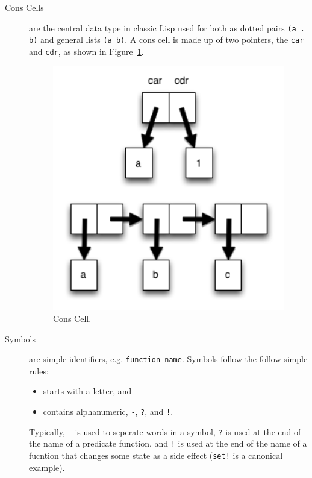 \documentclass[12pt]{article}
\begin{document}
\begin{description}

\item[Cons Cells] are the central data type in classic Lisp used for
  both as dotted pairs \verb|(a .  b)| and general lists \verb|(a b)|.
  A cons cell is made up of two pointers, the \verb|car| and
  \verb|cdr|, as shown in Figure~\ref{fig:conscell}.

\begin{figure}[htbp] %
   \centering
   \includegraphics[width=5in]{conscell.png} 
\caption{Cons Cell.}
\label{fig:conscell}
\end{figure}

\item[Symbols] are simple identifiers, e.g. \verb|function-name|.
Symbols follow the follow simple rules: 

\begin{itemize}
\item starts with a letter, and
\item contains alphanumeric, \verb|-|, \verb|?|, and \verb|!|.
\end{itemize}

Typically, \verb|-| is used to seperate words in a symbol, \verb|?| is
used at the end of the name of a predicate function, and \verb|!| is
used at the end of the name of a fucntion that changes some state as a
side effect (\verb|set!| is a canonical example).


\end{description}
\end{document}
